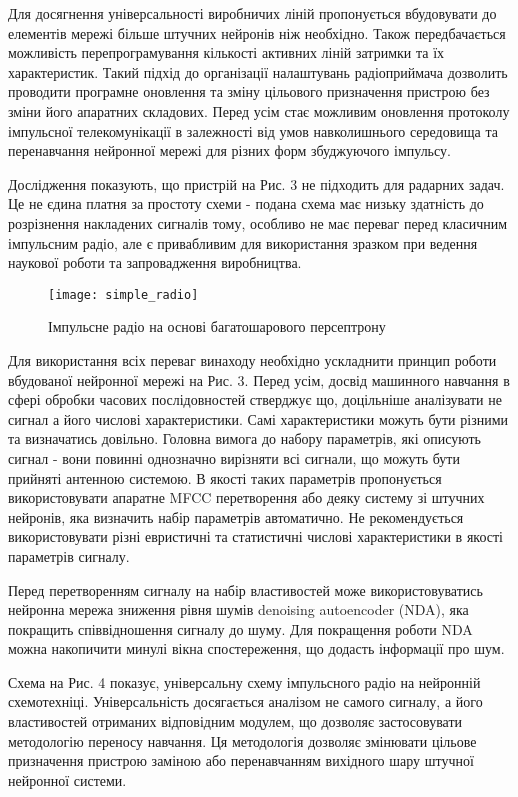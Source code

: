 Для досягнення універсальності виробничих ліній пропонується вбудовувати 
до елементів мережі більше штучних нейронів ніж необхідно. Також 
передбачається можливість перепрограмування кількості активних ліній 
затримки та їх характеристик. Такий підхід до організації налаштувань 
радіоприймача дозволить проводити програмне оновлення та зміну цільового 
призначення пристрою без зміни його апаратних складових.  Перед усім стає 
можливим оновлення протоколу імпульсної телекомунікації в залежності від 
умов навколишнього середовища та перенавчання нейронної мережі для різних 
форм збуджуючого імпульсу.

Дослідження показують, що пристрій на Рис. 3 не підходить для радарних 
задач. Це не єдина платня за простоту схеми - подана схема має низьку 
здатність до розрізнення накладених сигналів тому, особливо не має 
переваг перед класичним імпульсним радіо, але є привабливим для 
використання зразком при ведення наукової роботи та запровадження 
виробництва.

\begin{figure}[htbp] \begin{center}
\texttt{[image: simple\_radio]}
\caption{Імпульсне радіо на основі багатошарового персептрону} 
\label{fig:mp_radio}
\end{center} \end{figure}

Для використання всіх переваг винаходу необхідно ускладнити принцип 
роботи вбудованої нейронної мережі на Рис. 3. Перед усім, досвід 
машинного навчання в сфері обробки часових послідовностей стверджує що, 
доцільніше аналізувати не сигнал а його числові характеристики. 
Самі характеристики можуть бути різними та визначатись довільно. 
Головна вимога до набору параметрів, які описують сигнал - вони повинні 
однозначно вирізняти всі сигнали, що можуть бути прийняті антенною 
системою. В якості таких параметрів пропонується використовувати 
апаратне MFCC перетворення або деяку систему зі штучних нейронів, 
яка визначить набір параметрів автоматично. Не рекомендується 
використовувати різні евристичні та статистичні числові 
характеристики в якості параметрів сигналу.

Перед перетворенням сигналу на набір властивостей може використовуватись 
нейронна мережа зниження рівня шумів denoising autoencoder (NDA), 
яка покращить співвідношення сигналу до шуму. Для покращення роботи 
NDA можна накопичити минулі вікна спостереження, що додасть 
інформації про шум.

Схема на Рис. 4 показує, універсальну схему імпульсного радіо на 
нейронній схемотехніці. Універсальність досягається аналізом не самого 
сигналу, а його властивостей отриманих відповідним модулем, що дозволяє 
застосовувати методологію переносу навчання. Ця методологія дозволяє 
змінювати цільове призначення пристрою заміною або перенавчанням 
вихідного шару штучної нейронної системи.

